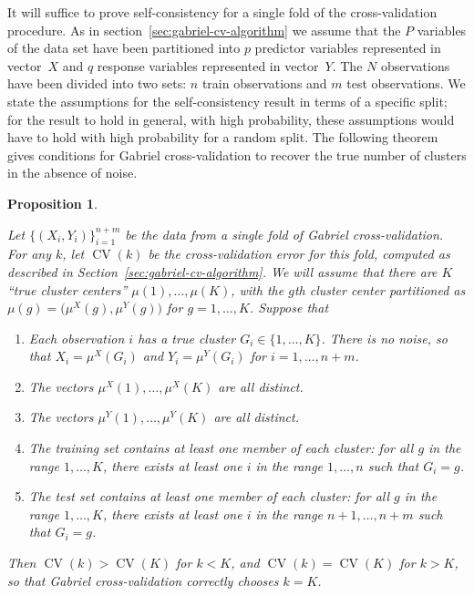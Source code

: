 \documentclass[12pt]{article}
\newtheorem{proposition}{Proposition}
\newcommand{\CV}{\operatorname{CV}}
\newcommand{\muX}{\mu^{X}}
\newcommand{\muY}{\mu^{Y}}
\begin{document}
It will suffice to prove self-consistency for a single fold of the
cross-validation procedure.  As in section~\ref{sec:gabriel-cv-algorithm} we
assume that the $P$ variables of the data set have been partitioned into $p$
predictor variables represented in vector~$X$ and $q$ response variables
represented in vector~$Y$.  The $N$ observations have been divided into two
sets: $n$ train observations and $m$ test observations.  We state the
assumptions for the self-consistency result in terms of a specific split; for
the result to hold in general, with high probability, these assumptions would
have to hold with high probability for a random split. The following theorem
gives conditions for Gabriel cross-validation to recover the true number of
clusters in the absence of noise.


\begin{proposition}\label{prop:self-consistency}

Let $\{ (X_i, Y_i) \}_{i=1}^{n+m}$ be the data from a single fold of Gabriel
cross-validation.  For any $k$, let $\CV(k)$ be the cross-validation error for
this fold, computed as described in Section~\ref{sec:gabriel-cv-algorithm}.
We will assume that there are $K$ ``true cluster centers''
$\mu(1), \dotsc,\mu(K)$, with
the $g$th cluster center partitioned as $\mu(g) = \bigl(\muX(g),
\muY(g)\bigr)$ for $g = 1, \dotsc, K$.  Suppose that
\begin{enumerate}[label=(\roman*)]
  \item \label{asn:self-consistency-noiseless}
    Each observation $i$ has a true cluster $G_i \in \{ 1, \dotsc, K \}$.
    There is no noise, so that $X_i = \muX({G_i})$ and $Y_i = \muY(G_i)$ for
    $i = 1, \dotsc, n+m$.
  \item \label{asn:self-consistency-distinct-mux}
    The vectors $\muX(1), \dotsc,\muX(K)$ are all distinct.
  \item \label{asn:self-consistency-distinct-muy}
    The vectors $\muY(1), \dotsc,\muY(K)$ are all distinct.
  \item \label{asn:self-consistency-train}
    The training set contains at least one member of each cluster: for all $g$
    in the range $1, \dotsc, K$, there exists at least one $i$ in the range
    $1, \dotsc, n$ such that $G_i = g$.
  \item \label{asn:self-consistency-test}
    The test set contains at least one member of each cluster: for all $g$ in
    the range $1, \dotsc, K$, there exists at least one $i$ in the range $n+1,
    \dotsc, n+m$ such that $G_i = g$.
\end{enumerate}
Then $\CV(k) > \CV(K)$ for $k < K$, and $\CV(k) = \CV(K)$ for $k > K$, so that
Gabriel cross-validation correctly chooses $k = K$.
\end{proposition}
\end{document}
